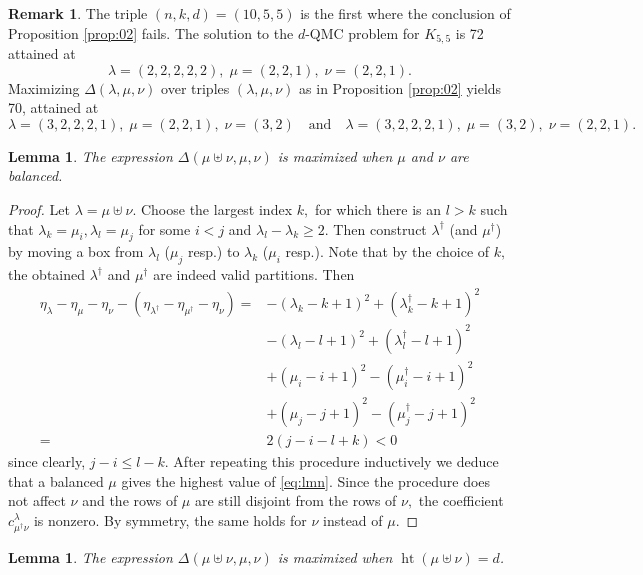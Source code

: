 \documentclass[12pt,dvipsnames,accepted=2016-08-18,a4paper,onecolumn]{quantumarticle}
\def\la{\lambda}
\DeclareMathOperator{\het}{ht}
\def\la{\lambda}
\numberwithin{equation}{section}
\newtheorem{lemma}[theorem]{Lemma}
\theoremstyle{definition}
\newtheorem{remark}[theorem]{Remark}
\begin{document}
\begin{remark}\label{rem:conj1}
The triple $(n,k,d)=(10,5,5)$ is the first where the conclusion of Proposition \ref{prop:02} fails.
The solution to the $d$-QMC problem for $K_{5,5}$ is 
72 attained at
\[
    \la=(2,2,2,2,2),\; \mu=(2,2,1),\; \nu=(2,2,1).
\]
Maximizing $\Delta(\la,\mu,\nu)$ over triples $(\la,\mu,\nu)$ as in Proposition \ref{prop:02} yields 70, attained at
\[
    \la=(3, 2, 2, 2, 1),
    \; \mu= (2, 2, 1),\; \nu=(3, 2)
    \quad \text{and} \quad
    \la=(3, 2, 2, 2, 1),\; \mu=(3, 2), \; \nu=({2, 2, 1}).
\]

\end{remark}

\begin{lemma}\label{lem:03}
The expression $\Delta(\mu\uplus\nu,\mu,\nu)$ is maximized when $\mu$ and $\nu$ are balanced.
\end{lemma}

\begin{proof} 
Let $\lambda=\mu\uplus\nu$. 
Choose the largest index $k,$ for which there is an $l>k$ such that
$\lambda_k=\mu_i,\lambda_l=\mu_j$ for some $i<j$ and
$\lambda_l -\lambda_k \geq 2.$ Then construct $\lambda^\dagger$ (and $\mu^\dagger$) by moving a box from $\lambda_l$ ($\mu_j$ resp.) to $\lambda_k$ ($\mu_i$ resp.). Note that by the choice of $k,$ the obtained $\lambda^\dagger$ and $\mu^\dagger$ are indeed valid partitions. Then
    \begin{align*}
        \eta_\lambda - \eta_\mu -\eta_\nu- (\eta_{\lambda^\dagger} - \eta_{\mu^\dagger} -\eta_\nu) = & - (\lambda_k-k+1)^2 + (\lambda_k^\dagger-k+1)^2 \\
        & - (\lambda_l-l+1)^2  + (\lambda_l^\dagger-l+1)^2\\
       &+ (\mu_{i}-i+1)^2 - (\mu_i^\dagger-i+1)^2 \\
        &+ (\mu_j-j+1)^2  - (\mu_j^\dagger-j+1)^2\\
         = \ & 2 (j-i - l + k) <0
    \end{align*}
    since clearly, $j-i \leq l-k.$ After repeating this procedure inductively we deduce that a balanced $\mu$ gives the highest value of \eqref{eq:lmn}.
    Since the procedure does not affect $\nu$ and the rows of $\mu$ are still disjoint from the rows of $\nu,$ the coefficient $c_{\mu^\dagger \nu}^\lambda$ is nonzero.
    By symmetry, the same holds for $\nu$ instead of $\mu.$
\end{proof}

\begin{lemma}\label{lem:04}
The expression $\Delta(\mu\uplus\nu,\mu,\nu)$ is maximized when $\het(\mu\uplus\nu)=d$.
\end{lemma}
\end{document}
